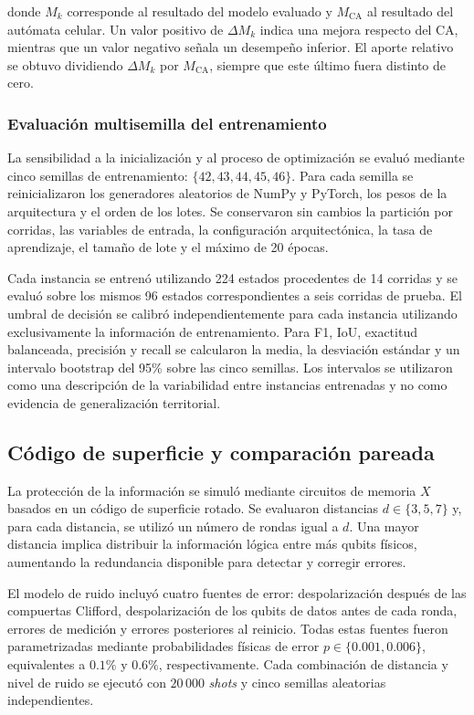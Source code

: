 \documentclass[fleqn,10pt]{wlscirep}
\begin{document}
donde $M_k$ corresponde al resultado del modelo evaluado y
$M_{\mathrm{CA}}$ al resultado del autómata celular. Un valor positivo
de $\Delta M_k$ indica una mejora respecto del CA, mientras que un valor
negativo señala un desempeño inferior. El aporte relativo se obtuvo
dividiendo $\Delta M_k$ por $M_{\mathrm{CA}}$, siempre que este último
fuera distinto de cero.


\subsubsection*{Evaluación multisemilla del entrenamiento}

La sensibilidad a la inicialización y al proceso de optimización se
evaluó mediante cinco semillas de entrenamiento:
$\{42,43,44,45,46\}$. Para cada semilla se reinicializaron los
generadores aleatorios de NumPy y PyTorch, los pesos de la arquitectura
y el orden de los lotes. Se conservaron sin cambios la partición por
corridas, las variables de entrada, la configuración arquitectónica,
la tasa de aprendizaje, el tamaño de lote y el máximo de 20 épocas.

Cada instancia se entrenó utilizando 224 estados procedentes de 14
corridas y se evaluó sobre los mismos 96 estados correspondientes a
seis corridas de prueba. El umbral de decisión se calibró
independientemente para cada instancia utilizando exclusivamente la
información de entrenamiento. Para F1, IoU, exactitud balanceada,
precisión y recall se calcularon la media, la desviación estándar y un
intervalo bootstrap del 95\% sobre las cinco semillas. Los intervalos
se utilizaron como una descripción de la variabilidad entre instancias
entrenadas y no como evidencia de generalización territorial.


\subsection*{Código de superficie y comparación pareada}

La protección de la información se simuló mediante circuitos de memoria
$X$ basados en un código de superficie rotado. Se evaluaron distancias
$d\in\{3,5,7\}$ y, para cada distancia, se utilizó un número de rondas
igual a $d$. Una mayor distancia implica distribuir la información
lógica entre más qubits físicos, aumentando la redundancia disponible
para detectar y corregir errores.

El modelo de ruido incluyó cuatro fuentes de error: despolarización
después de las compuertas Clifford, despolarización de los qubits de
datos antes de cada ronda, errores de medición y errores posteriores al
reinicio. Todas estas fuentes fueron parametrizadas mediante
probabilidades físicas de error $p\in\{0.001,0.006\}$, equivalentes a
$0.1\%$ y $0.6\%$, respectivamente. Cada combinación de distancia y
nivel de ruido se ejecutó con $20\,000$ \textit{shots} y cinco semillas
aleatorias independientes.
\end{document}
